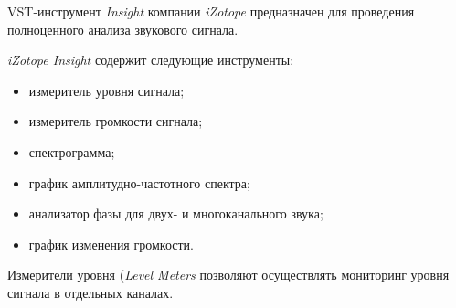 \documentclass{beamer}
\begin{document}
\begin{frame}
VST-инструмент \textit{Insight} компании \textit{iZotope} предназначен для проведения полноценного анализа звукового сигнала. 

\end{frame}

\begin{frame}
\textit{iZotope Insight} содержит следующие инструменты: 
\begin{itemize}
\item измеритель уровня сигнала;
\item измеритель громкости сигнала;
\item спектрограмма;
\item график амплитудно-частотного спектра;
\item анализатор фазы для двух- и многоканального звука;
\item график изменения громкости. 
\end{itemize} 

Измерители уровня (\textit{Level Meters} позволяют осуществлять мониторинг уровня сигнала в отдельных каналах. 

\end{frame}
\end{document}
